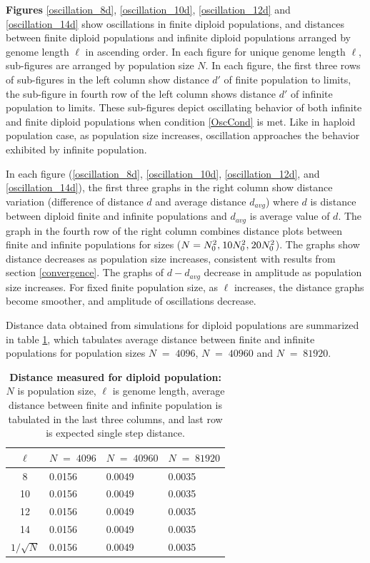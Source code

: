
\clearpage

\textbf{ Figures} \ref{oscillation_8d}, \ref{oscillation_10d}, \ref{oscillation_12d} 
and \ref{oscillation_14d} show oscillations in finite diploid populations, and distances 
between finite diploid populations and infinite diploid populations arranged by genome length $\ell$ in ascending order. 
In each figure for unique genome length $\ell$, sub-figures 
are arranged by population size $N$. In each figure, the first three rows of sub-figures in the left column show distance $d'$ of finite population 
to limits, the sub-figure in fourth row of the left column shows distance $d'$ of infinite population to limits. These sub-figures depict 
oscillating behavior of both infinite and finite diploid populations when condition \ref{OscCond} is met. 
Like in haploid population case, as population size increases, oscillation approaches the behavior exhibited by infinite population. 

In each figure (\ref{oscillation_8d}, \ref{oscillation_10d}, \ref{oscillation_12d}, 
and \ref{oscillation_14d}), the first three graphs in the right column show 
distance variation (difference of distance $d$ and average distance $d_{avg}$)  
where $d$ is distance between diploid finite and infinite populations and $d_{avg}$ is average value of $d$. 
The graph in the fourth row of the right column combines distance plots between finite and infinite populations for sizes 
($N = N_0^2, \hspace{0.01in}10N_0^2, \hspace{0.01in}20N_0^2$). The graphs show distance decreases 
as population size increases, consistent with results from section \ref{convergence}. 
The graphs of $d-d_{avg}$ decrease in amplitude as population size increases. 
For fixed finite population size, as $\ell$ increases, the distance graphs become smoother, and amplitude of oscillations decrease.

Distance data obtained from simulations for diploid populations are summarized in table \ref{tableDistanceOscDip}, 
which tabulates average distance between finite and infinite populations 
for population sizes $N \;=\; 4096 $, $N \;=\; 40960 $ and $N \;=\; 81920 $.
%
\begin{table}[h]
\caption[\textbf{Distance measured for diploid population}]{\textbf{Distance measured for diploid population:} $N$ is population size, $\ell$ is genome length, 
average distance between finite and infinite population is tabulated in the last three columns, and last row is expected single step distance.}
\centering
\begin{tabularx}{0.75\textwidth}{ c *{3}{X}}
\toprule
$\ell$ & $N \;=\; 4096 $ & $N \;=\; 40960 $ & $N \;=\; 81920 $\\
\midrule
8 & 0.0156 & 0.0049 & 0.0035 \\
10 & 0.0156 & 0.0049 & 0.0035 \\
12 & 0.0156 & 0.0049 & 0.0035 \\
14 & 0.0156 & 0.0049 & 0.0035 \\
\midrule
$1/\sqrt{N}$ & 0.0156 & 0.0049 & 0.0035 \\
\bottomrule

\end{tabularx}
\label{tableDistanceOscDip}
\end{table}

